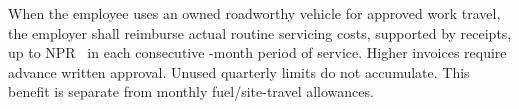 When the employee uses an owned roadworthy vehicle for approved work travel,
the employer shall reimburse actual routine servicing costs, supported by receipts,
up to NPR \VehicleCap\ in each consecutive \VehicleInterval-month period of service.
Higher invoices require advance written approval. Unused quarterly limits do not
accumulate. This benefit is separate from monthly fuel/site-travel allowances.

